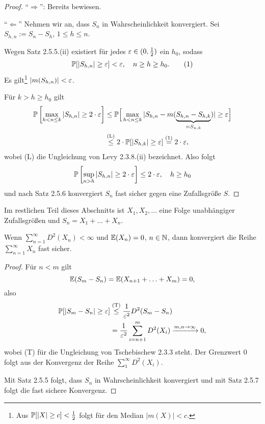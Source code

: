 \begin{proof}
  ``$\Rightarrow$'': Bereits bewiesen.

  ``$\Leftarrow$'' Nehmen wir an, dass $S_n$ in Wahrscheinlichkeit konvergiert.
  Sei $S_{h,n} := S_n - S_h$, $1 \le h \le n$.

  Wegen Satz 2.5.5.(ii) existiert für jedes $\varepsilon \in (0, \frac{1}{2})$ ein $h_0$,
  sodass
  \[ \mathbb{P} [ |S_{h,n}| \ge \varepsilon ] < \varepsilon, \quad n \ge h \ge h_0. \tag{1} \]
  Es gilt\footnote{%
    Aus $\mathbb{P}[|X| \ge c] < \frac{1}{2}$ folgt für den Median $|m(X)| < c$.}
  $|m(S_{h,n})| < \varepsilon$.

  Für $k > h \ge h_0$ gilt
  \begin{align*}
    \mathbb{P} \left[ \max_{h < n \le k} |S_{h,n}| \ge 2 \cdot \varepsilon \right]
    &\le \mathbb{P} \Big[ \max_{h < n \le k} |S_{h,n} - m(\underbrace{S_{h,n} -
      S_{h,k}}_{= S_{n,k}}) | \ge \varepsilon \Big] \\
    &\overset{\text{(L)}}{\le} 2 \cdot \mathbb{P}[ |S_{h,k}| \ge \varepsilon ] \overset{\text{(1)}}{=} 2 \cdot \varepsilon,
  \end{align*}
  wobei (L) die Ungleichung von Levy 2.3.8.(ii) bezeichnet. Also folgt
  \[ \mathbb{P} \left[ \sup_{n > h} |S_{h,n}| \ge 2 \cdot \varepsilon  \right] \le 2 \cdot
    \varepsilon, \quad h \ge h_0\]
  und nach Satz 2.5.6 konvergiert $S_n$ fast sicher gegen eine Zufallsgröße $S$.
\end{proof}

Im restlichen Teil dieses Abschnitts ist $X_1, X_2, \ldots$ eine Folge
unabhängiger Zufallsgrößen und $S_n = X_1 + \ldots + X_n$.

\begin{thm}
  Wenn $\sum_{n=1}^\infty D^2(X_n) < \infty$ und $\mathbb{E}(X_n)=0$, $n \in \mathbb{N}$,
  dann konvergiert die Reihe $\sum_{n=1}^\infty X_n$ fast sicher.
\end{thm}

\begin{proof}
  Für $n < m$ gilt
  \[ \mathbb{E}(S_m - S_n) = \mathbb{E}( X_{n+1} + \ldots + X_m) = 0, \]
  also
  \begin{align*}
    \mathbb{P}[ |S_m - S_n| \ge \varepsilon ]
    &\overset{\text{(T)}}{\le} \frac{1}{\varepsilon^2} D^2(S_m - S_n) \\
    &= \frac{1}{\varepsilon^2} \sum_{i=n + 1}^m D^2(X_i) \xrightarrow{m,n \to \infty} 0,
  \end{align*}
  wobei (T) für die Ungleichung von Tschebischew 2.3.3 steht. Der Grenzwert 0
  folgt aus der Konvergenz der Reihe $\sum_1^\infty D^2(X_i)$.

  Mit Satz 2.5.5 folgt, dass $S_n$ in Wahrscheinlichkeit konvergiert und mit
  Satz 2.5.7 folgt die fast sichere Konvergenz.
\end{proof}

